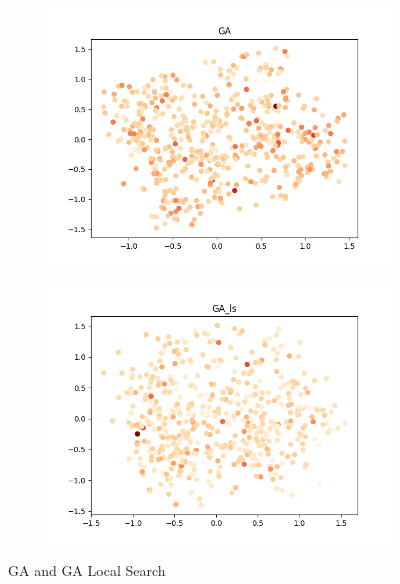 \documentclass[11pt, letterpaper, onecolumn]{article}
\begin{document}
\begin{figure}[h!]
  \centering
  \begin{subfigure}[b]{0.4\linewidth}
    \includegraphics[width=\linewidth]{graphs/GA__pca.png}
  \end{subfigure}
  \begin{subfigure}[b]{0.4\linewidth}
    \includegraphics[width=\linewidth]{graphs/GA_ls__pca.png}
  \end{subfigure}
  \caption{GA and GA Local Search}
  \label{fig:coffee}
\end{figure}
\end{document}
